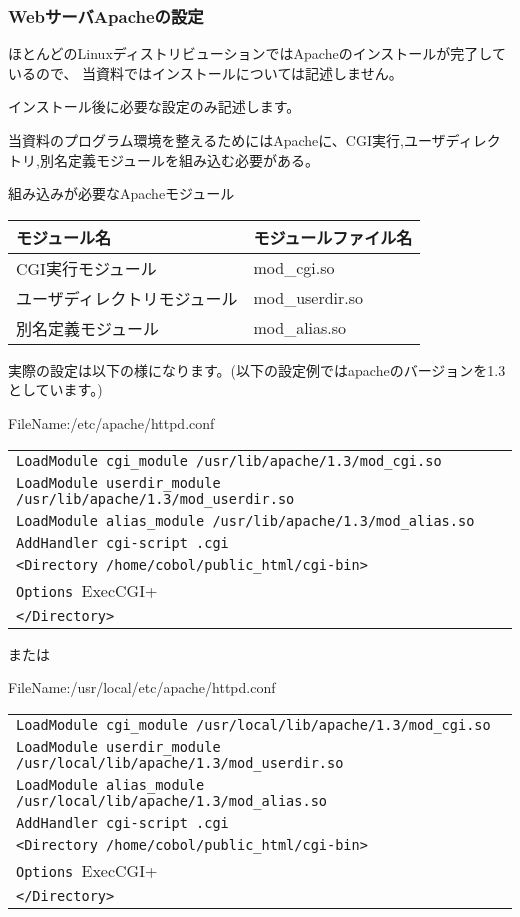 \subsubsection{WebサーバApacheの設定}

ほとんどのLinuxディストリビューションではApacheのインストールが完了しているので、
当資料ではインストールについては記述しません。

インストール後に必要な設定のみ記述します。

当資料のプログラム環境を整えるためにはApacheに、CGI実行,ユーザディレクトリ,別名定義モジュールを組み込む必要がある。

\vspace{1em}
{\gt 組み込みが必要なApacheモジュール}

\begin{tabular}{|l|l|}
\hline
モジュール名 & モジュールファイル名 \\
\hline
CGI実行モジュール		&mod\_cgi.so	\\
ユーザディレクトリモジュール	&mod\_userdir.so\\
別名定義モジュール		&mod\_alias.so	\\
\hline
\end{tabular}

実際の設定は以下の様になります。(以下の設定例ではapacheのバージョンを1.3としています。)

FileName:/etc/apache/httpd.conf

\begin{tabular}{|l|}
\hline
\verb+LoadModule cgi_module /usr/lib/apache/1.3/mod_cgi.so+\\
\verb+LoadModule userdir_module /usr/lib/apache/1.3/mod_userdir.so+\\
\verb+LoadModule alias_module /usr/lib/apache/1.3/mod_alias.so+\\
\verb+AddHandler cgi-script .cgi+\\
\verb+<Directory /home/cobol/public_html/cgi-bin>+\\
\verb+Options +ExecCGI+\\
\verb+</Directory>+\\
\hline
\end{tabular}

または

FileName:/usr/local/etc/apache/httpd.conf

\begin{tabular}{|l|}
\hline
\verb+LoadModule cgi_module /usr/local/lib/apache/1.3/mod_cgi.so+\\
\verb+LoadModule userdir_module /usr/local/lib/apache/1.3/mod_userdir.so+\\
\verb+LoadModule alias_module /usr/local/lib/apache/1.3/mod_alias.so+\\
\verb+AddHandler cgi-script .cgi+\\
\verb+<Directory /home/cobol/public_html/cgi-bin>+\\
\verb+Options +ExecCGI+\\
\verb+</Directory>+\\
\hline
\end{tabular}

